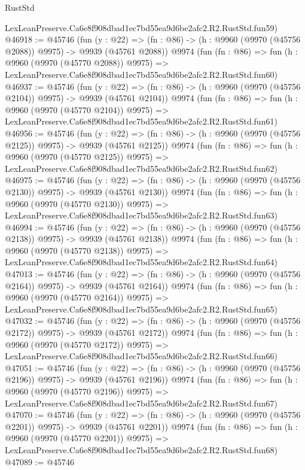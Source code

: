 \begin{lexlean}{RustStd}
\begin{coremodule}
    LexLeanPreserve.Ca6e8f908dbad1ec7bd55ea9d6be2afc2.R2.RustStd.fun59)
@46918 := @45746
    (fun (y : @22) =>
    (fn : @86) -> (h : @9960 (@9970 (@45756 @2088)) @9975) -> @9939 (@45761 @2088))
    @9974
    (fun (fn : @86) =>
    fun (h : @9960 (@9970 (@45770 @2088)) @9975) =>
    LexLeanPreserve.Ca6e8f908dbad1ec7bd55ea9d6be2afc2.R2.RustStd.fun60)
@46937 := @45746
    (fun (y : @22) =>
    (fn : @86) -> (h : @9960 (@9970 (@45756 @2104)) @9975) -> @9939 (@45761 @2104))
    @9974
    (fun (fn : @86) =>
    fun (h : @9960 (@9970 (@45770 @2104)) @9975) =>
    LexLeanPreserve.Ca6e8f908dbad1ec7bd55ea9d6be2afc2.R2.RustStd.fun61)
@46956 := @45746
    (fun (y : @22) =>
    (fn : @86) -> (h : @9960 (@9970 (@45756 @2125)) @9975) -> @9939 (@45761 @2125))
    @9974
    (fun (fn : @86) =>
    fun (h : @9960 (@9970 (@45770 @2125)) @9975) =>
    LexLeanPreserve.Ca6e8f908dbad1ec7bd55ea9d6be2afc2.R2.RustStd.fun62)
@46975 := @45746
    (fun (y : @22) =>
    (fn : @86) -> (h : @9960 (@9970 (@45756 @2130)) @9975) -> @9939 (@45761 @2130))
    @9974
    (fun (fn : @86) =>
    fun (h : @9960 (@9970 (@45770 @2130)) @9975) =>
    LexLeanPreserve.Ca6e8f908dbad1ec7bd55ea9d6be2afc2.R2.RustStd.fun63)
@46994 := @45746
    (fun (y : @22) =>
    (fn : @86) -> (h : @9960 (@9970 (@45756 @2138)) @9975) -> @9939 (@45761 @2138))
    @9974
    (fun (fn : @86) =>
    fun (h : @9960 (@9970 (@45770 @2138)) @9975) =>
    LexLeanPreserve.Ca6e8f908dbad1ec7bd55ea9d6be2afc2.R2.RustStd.fun64)
@47013 := @45746
    (fun (y : @22) =>
    (fn : @86) -> (h : @9960 (@9970 (@45756 @2164)) @9975) -> @9939 (@45761 @2164))
    @9974
    (fun (fn : @86) =>
    fun (h : @9960 (@9970 (@45770 @2164)) @9975) =>
    LexLeanPreserve.Ca6e8f908dbad1ec7bd55ea9d6be2afc2.R2.RustStd.fun65)
@47032 := @45746
    (fun (y : @22) =>
    (fn : @86) -> (h : @9960 (@9970 (@45756 @2172)) @9975) -> @9939 (@45761 @2172))
    @9974
    (fun (fn : @86) =>
    fun (h : @9960 (@9970 (@45770 @2172)) @9975) =>
    LexLeanPreserve.Ca6e8f908dbad1ec7bd55ea9d6be2afc2.R2.RustStd.fun66)
@47051 := @45746
    (fun (y : @22) =>
    (fn : @86) -> (h : @9960 (@9970 (@45756 @2196)) @9975) -> @9939 (@45761 @2196))
    @9974
    (fun (fn : @86) =>
    fun (h : @9960 (@9970 (@45770 @2196)) @9975) =>
    LexLeanPreserve.Ca6e8f908dbad1ec7bd55ea9d6be2afc2.R2.RustStd.fun67)
@47070 := @45746
    (fun (y : @22) =>
    (fn : @86) -> (h : @9960 (@9970 (@45756 @2201)) @9975) -> @9939 (@45761 @2201))
    @9974
    (fun (fn : @86) =>
    fun (h : @9960 (@9970 (@45770 @2201)) @9975) =>
    LexLeanPreserve.Ca6e8f908dbad1ec7bd55ea9d6be2afc2.R2.RustStd.fun68)
@47089 := @45746

\end{coremodule}
\end{lexlean}
